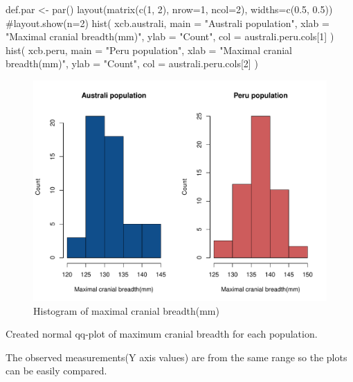 \documentclass[12pt, oneside]{report}\usepackage[]{graphicx}\usepackage[]{color}
\begin{document}
\begin{Schunk}
\begin{Sinput}
def.par <- par()
layout(matrix(c(1, 2), nrow=1, ncol=2), widths=c(0.5, 0.5))
#layout.show(n=2)
hist(
  xcb.australi, 
  main = "Australi population", 
  xlab = "Maximal cranial breadth(mm)", 
  ylab = "Count", 
  col = australi.peru.cols[1]
)
hist(
  xcb.peru, 
  main = "Peru population", 
  xlab = "Maximal cranial breadth(mm)", 
  ylab = "Count", 
  col = australi.peru.cols[2]
)
\end{Sinput}
\begin{figure}[h]

{\centering \includegraphics[width=.6\textheight,height=.45\textheight]{figure/unnamed-chunk-6-1} 

}

\caption[Histogram of maximal cranial breadth(mm)]{Histogram of maximal cranial breadth(mm)}\label{fig:unnamed-chunk-6}
\end{figure}
\end{Schunk}

\bigskip
\newpage
Created normal qq-plot of maximum cranial breadth for each population.

\noindent The observed measurements(Y axis values) are from the same range so the plots can be easily compared.
\end{document}
